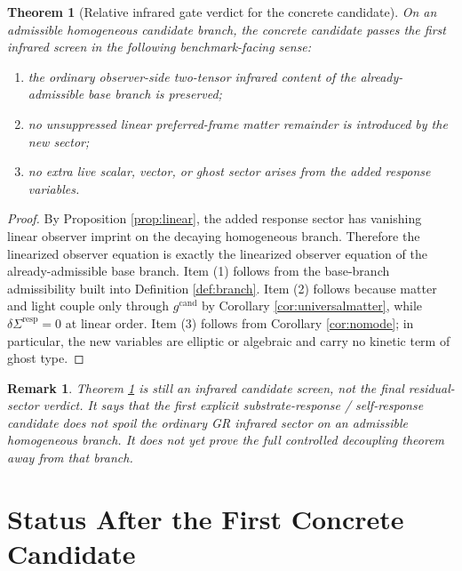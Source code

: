 \documentclass[11pt]{article}
\newcommand{\CandidateMetric}{g^{\mathrm{cand}}}
\newcommand{\ResponseShift}{\Sigma^{\mathrm{resp}}}
\newtheorem{remark}{Remark}
\newtheorem{theorem}{Theorem}
\begin{document}
\begin{theorem}[Relative infrared gate verdict for the concrete candidate]
\label{thm:ir}
On an admissible homogeneous candidate branch, the concrete candidate passes the first infrared screen in the following benchmark-facing sense:
\begin{enumerate}
    \item the ordinary observer-side two-tensor infrared content of the already-admissible base branch is preserved;
    \item no unsuppressed linear preferred-frame matter remainder is introduced by the new sector;
    \item no extra live scalar, vector, or ghost sector arises from the added response variables.
\end{enumerate}
\end{theorem}

\begin{proof}
By Proposition \ref{prop:linear}, the added response sector has vanishing linear observer imprint on the decaying homogeneous branch. Therefore the linearized observer equation is exactly the linearized observer equation of the already-admissible base branch. Item (1) follows from the base-branch admissibility built into Definition \ref{def:branch}. Item (2) follows because matter and light couple only through \(\CandidateMetric\) by Corollary \ref{cor:universalmatter}, while \(\delta\ResponseShift=0\) at linear order. Item (3) follows from Corollary \ref{cor:nomode}; in particular, the new variables are elliptic or algebraic and carry no kinetic term of ghost type.
\end{proof}

\begin{remark}
Theorem \ref{thm:ir} is still an infrared candidate screen, not the final residual-sector verdict. It says that the first explicit substrate-response / self-response candidate does not spoil the ordinary GR infrared sector on an admissible homogeneous branch. It does not yet prove the full controlled decoupling theorem away from that branch.
\end{remark}

\section{Status After the First Concrete Candidate}
\end{document}
